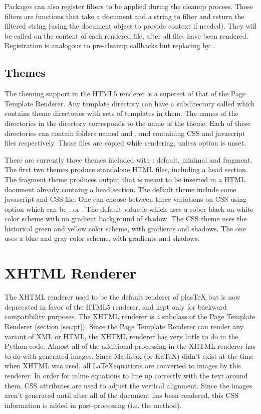 Packages can also register filters to be applied during the cleanup
process. Those filters are functions that take a document and a string
to filter and return the filtered string (using the document object to
provide context if needed). They will be called on the content of each
rendered file, after all files have been rendered.  Registration is
analogous to pre-cleanup callbacks but replacing
 by .

\subsection{Themes}

The theming support in the HTML5 renderer is a superset of that of the
Page Template Renderer. Any template directory can have a subdirectory called
 which contains theme directories with sets of templates
in them.  The names of the directories in the  directory
corresponds to the name of the theme. Each of these directories can contain
folders named  and , and containing CSS and javascript files
respectively. Those files are copied while rendering, unless
option  is unset.

There are currently three themes included with \plasTeX: default, minimal and
fragment. The first two themes produce standalone HTML files, including a head
section. The fragment theme produces output that is meant to be inserted in a
HTML document already containg a head section. The default theme include some
javascript and CSS file. One can choose between three variations on CSS using
option  which can be ,  or
. The default value is  which uses a sober black on
white color scheme with no gradient background of shadow. The 
CSS theme uses the historical \plasTeX{} green and yellow color scheme, with
gradients and shadows. The  one uses a blue and gray color scheme,
with gradients and shadows.

\section{XHTML Renderer}

The XHTML renderer used to be the default renderer of plasTeX but is now 
deprecated in favor of the HTML5 renderer, and kept only for
backward compatibility purposes. 
The XHTML renderer is a subclass of the Page Template Renderer (section
\ref{sec:pt}). Since the Page Template Renderer can render any variant
of XML or HTML, the XHTML renderer has very little to do in the Python
code. Almost all of the additional processing in the XHTML renderer has
to do with generated images.
Since MathJax (or KaTeX) didn't exist at the time when XHTML was used, 
all \LaTeX equations are converted to images by this renderer. In order
for inline equations to line up correctly with the text around them, CSS
attributes are used to adjust the vertical alignment.  Since the images
aren't generated until after all of the document has been rendered, this
CSS information is added in post-processing (i.e. the 
method).

